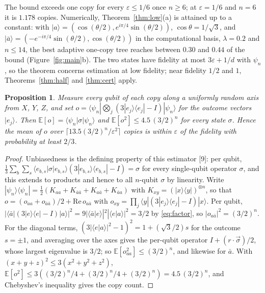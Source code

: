 \documentclass[11pt]{article}
\newtheorem{proposition}[theorem]{Proposition}
\theoremstyle{remark}
\newcommand{\eps}{\varepsilon}
\newcommand{\ket}[1]{|#1\rangle}
\newcommand{\bra}[1]{\langle #1|}
\newcommand{\abar}{\bar a}
\newcommand{\E}{\mathbb{E}}
\begin{document}
The bound exceeds one copy for every $\eps\le1/6$ once $n\ge6$; at $\eps = 1/6$ and $n = 6$ it is $1.178$ copies. Numerically, Theorem~\ref{thm:low}(a) is attained up to a constant: with $\ket a = (\cos(\theta/2), e^{i\pi/4}\sin(\theta/2))$, $\cos\theta = 1/\sqrt3$, and $\ket\abar = (-e^{-i\pi/4}\sin(\theta/2), \cos(\theta/2))$ in the computational basis, $\lambda = 0.2$ and $n\le14$, the best adaptive one-copy tree reaches between $0.30$ and $0.44$ of the bound (Figure~\ref{fig:main}b). The two states have fidelity at most $3\eps+1/d$ with $\psi_n$, so the theorem concerns estimation at low fidelity; near fidelity $1/2$ and $1$, Theorems~\ref{thm:half} and \ref{thm:cert} apply.

\begin{proposition}\label{prop:tight}
Measure every qubit of each copy along a uniformly random axis from $X$, $Y$, $Z$, and set $o = \bra{\psi_n}\bigotimes_j(3\ket{e_j}\bra{e_j}-I)\ket{\psi_n}$ for the outcome vectors $\ket{e_j}$. Then $\E[o] = \bra{\psi_n}\sigma\ket{\psi_n}$ and $\E[o^2]\le4.5\,(3/2)^n$ for every state $\sigma$. Hence the mean of $o$ over $\lceil13.5(3/2)^n/\eps^2\rceil$ copies is within $\eps$ of the fidelity with probability at least $2/3$.
\end{proposition}

\begin{proof}
Unbiasedness is the defining property of this estimator [9]: per qubit, $\frac13\sum_b\sum_s\bra{e_{b,s}}\sigma\ket{e_{b,s}}(3\ket{e_{b,s}}\bra{e_{b,s}}-I) = \sigma$ for every single-qubit operator $\sigma$, and this extends to products and hence to all $n$-qubit $\sigma$ by linearity. Write $\ket{\psi_n}\bra{\psi_n} = \frac12(K_{aa}+K_{\abar\abar}+K_{a\abar}+K_{\abar a})$ with $K_{xy} = (\ket x\bra y)^{\otimes n}$, so that $o = (o_{aa}+o_{\abar\abar})/2+\mathrm{Re}\,o_{a\abar}$ with $o_{xy} = \prod_j\bra y(3\ket{e_j}\bra{e_j}-I)\ket x$. Per qubit, $|\bra\abar(3\ket e\bra e-I)\ket a|^2 = 9|\langle\abar|e\rangle|^2|\langle e|a\rangle|^2 = 3/2$ by \eqref{eq:factor}, so $|o_{a\abar}|^2 = (3/2)^n$. For the diagonal terms, $(3|\langle e|a\rangle|^2-1)^2 = 1+(\sqrt3/2)s$ for the outcome $s = \pm1$, and averaging over the axes gives the per-qubit operator $I+(r\cdot\vec\sigma)/2$, whose largest eigenvalue is $3/2$; so $\E[o_{aa}^2]\le(3/2)^n$, and likewise for $\abar$. With $(x+y+z)^2\le3(x^2+y^2+z^2)$, $\E[o^2]\le3((3/2)^n/4+(3/2)^n/4+(3/2)^n) = 4.5\,(3/2)^n$, and Chebyshev's inequality gives the copy count.
\end{proof}
\end{document}
